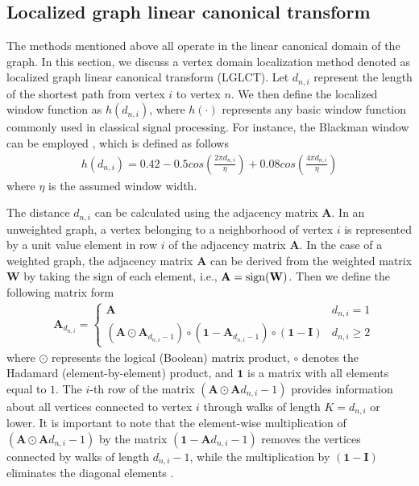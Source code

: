 \documentclass[lettersize,journal]{IEEEtran}
\begin{document}
\subsection{Localized graph linear canonical transform}
The methods mentioned above all operate in the linear canonical domain of the graph. In this section, we discuss a vertex domain localization method denoted as localized graph linear canonical transform (LGLCT).
Let $d_{n,i}$ represent the length of the shortest path from vertex $i$ to vertex $n$. We then define the localized window function as $h(d_{n,i})$, where $h(\cdot)$ represents any basic window function commonly used in classical signal processing. For instance, the Blackman window can be employed \cite{podder2014comparative}, which is defined as follows
\begin{align}
	h(d_{n,i})=0.42-0.5cos\left(\frac{2\pi 
		d_{n,i}}{\eta}\right)+0.08cos\left(\frac{4\pi d_{n,i}}{\eta}\right)
\end{align}
where $\eta$ is the assumed window width.

The distance $d_{n,i}$ can be calculated using the adjacency matrix $\mathbf{A}$. In an unweighted graph, a vertex belonging to a neighborhood of vertex $i$ is represented by a unit value element in row $i$ of the adjacency matrix $\mathbf{A}$. In the case of a weighted graph, the adjacency matrix $\mathbf{A}$ can be derived from the weighted matrix $\mathbf{W}$ by taking the sign of each element, i.e., $\mathbf{A} = {\rm sign}(\mathbf{W})$. Then we define the following matrix form
\begin{align}
	& \mathbf{A}_{d_{n,i}}
	= \begin{cases}\mathbf{A}  & d_{n,i}=1 \\
		(\mathbf{A} \odot \mathbf{A}_{d_{n,i}-1}) \circ (\mathbf{1} - \mathbf{A}_{d_{n,i}-1})\circ (\mathbf{1} - \mathbf{I}) & d_{n,i}\geq 2 \end{cases}  
\end{align}
where $\odot$ represents the logical (Boolean) matrix product, $\circ$ denotes the Hadamard (element-by-element) product, and $\mathbf{1}$ is a matrix with all elements equal to $1$. The $i$-th row of the matrix $(\mathbf{A} \odot \mathbf{A}{d_{n,i}-1})$ provides information about all vertices connected to vertex $i$ through walks of length $K = d_{n,i}$ or lower. It is important to note that the element-wise multiplication of $(\mathbf{A} \odot \mathbf{A}{d_{n,i}-1})$ by the matrix $(\mathbf{1} - \mathbf{A}{d_{n,i}-1})$ removes the vertices connected by walks of length $d_{n,i}-1$, while the multiplication by $(\mathbf{1} - \mathbf{I})$ eliminates the diagonal elements \cite{stankovic2020vertex}.
\end{document}
